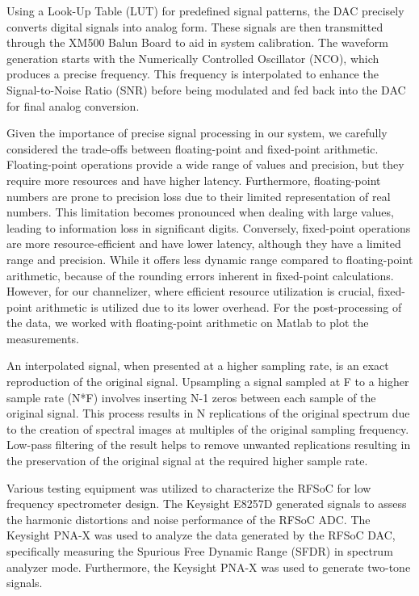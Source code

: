 \documentclass[fleqn,usenatbib]{rasti}
\begin{document}
Using a Look-Up Table (LUT) for predefined signal patterns, the DAC precisely converts digital signals into analog form. These signals are then transmitted through the XM500 Balun Board to aid in system calibration. The waveform generation starts with the Numerically Controlled Oscillator (NCO), which produces a precise frequency. This frequency is interpolated to enhance the Signal-to-Noise Ratio (SNR) before being modulated and fed back into the DAC for final analog conversion.

Given the importance of precise signal processing in our system, we carefully considered the trade-offs between floating-point and fixed-point arithmetic. Floating-point operations provide a wide range of values and precision, but they require more resources and have higher latency. Furthermore, floating-point numbers are prone to precision loss due to their limited representation of real numbers. This limitation becomes pronounced when dealing with large values, leading to information loss in significant digits. Conversely, fixed-point operations are more resource-efficient and have lower latency, although they have a limited range and precision. While it offers less dynamic range compared to floating-point arithmetic, because of the rounding errors inherent in fixed-point calculations. However, for our channelizer, where efficient resource utilization is crucial, fixed-point arithmetic is utilized due to its lower overhead. For the post-processing of the data, we worked with floating-point arithmetic on Matlab to plot the measurements. 

An interpolated signal, when presented at a higher sampling rate, is an exact reproduction of the original signal. Upsampling a signal sampled at F to a higher sample rate (N*F) involves inserting N-1 zeros between each sample of the original signal. This process results in N replications of the original spectrum due to the creation of spectral images at multiples of the original sampling frequency. Low-pass filtering of the result helps to remove unwanted replications resulting in the preservation of the original signal at the required higher sample rate.

Various testing equipment was utilized to characterize the RFSoC for low frequency spectrometer design. The Keysight E8257D generated signals to assess the harmonic distortions and noise performance of the RFSoC ADC. The Keysight PNA-X was used to analyze the data generated by the RFSoC DAC, specifically measuring the Spurious Free Dynamic Range (SFDR) in spectrum analyzer mode. Furthermore, the Keysight PNA-X was used to generate two-tone signals.
\end{document}
